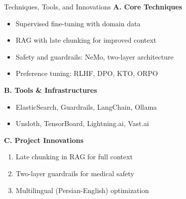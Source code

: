\begin{frame}{Techniques, Tools, and Innovations}
    \textbf{A. Core Techniques}
    \begin{itemize}
        \item Supervised fine-tuning with domain data
        \item RAG with late chunking for improved context
        \item Safety and guardrails: NeMo, two-layer architecture
        \item Preference tuning: RLHF, DPO, KTO, ORPO
    \end{itemize}
    \vspace{0.5em}
    \textbf{B. Tools \& Infrastructures}
    \begin{itemize}
        \item ElasticSearch, Guardrails, LangChain, Ollama
        \item Unsloth, TensorBoard, Lightning.ai, Vast.ai
    \end{itemize}
    \vspace{0.5em}
    \textbf{C. Project Innovations}
    \begin{enumerate}
        \item Late chunking in RAG for full context
        \item Two-layer guardrails for medical safety
        \item Multilingual (Persian-English) optimization
    \end{enumerate}
\end{frame}
